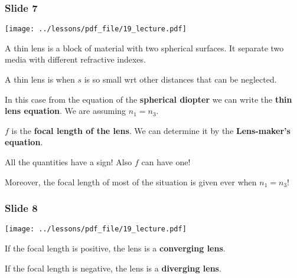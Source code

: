 \documentclass[../main/main.tex]{subfiles}
\begin{document}
\newpage

\subsubsection*{Slide 7}

\begin{minipage}[]{0.5\linewidth}
\centering
\texttt{[image: ../lessons/pdf\_file/19\_lecture.pdf]}
\end{minipage}
\hspace{0.3cm}\vspace{0.3cm}
\begin{minipage}[c]{0.47\linewidth}

A thin lens is a block of material with two spherical surfaces. It separate two media with different refractive indexes.

A thin lens is when \( s \) is so small wrt other distances that can be neglected.

In this case from the equation of the \textbf{spherical diopter} we can write the \textbf{thin lens equation}. We are assuming \( n_1 = n_3 \).


\( f \) is the \textbf{focal length of the lens}.
We can determine it by the \textbf{Lens-maker's equation}.

All the quantities have a sign! Also \( f \) can have one!

Moreover, the focal length of most of the situation is given ever when \( n_1 = n_3 \)!

\end{minipage}

\subsubsection*{Slide 8}

\begin{minipage}[]{0.5\linewidth}
\centering
\texttt{[image: ../lessons/pdf\_file/19\_lecture.pdf]}
\end{minipage}
\hspace{0.3cm}\vspace{0.3cm}
\begin{minipage}[c]{0.47\linewidth}

If the focal length is positive, the lens is a \textbf{converging lens}.

If the focal length is negative, the lens is a \textbf{diverging lens}.

\end{minipage}
\end{document}
